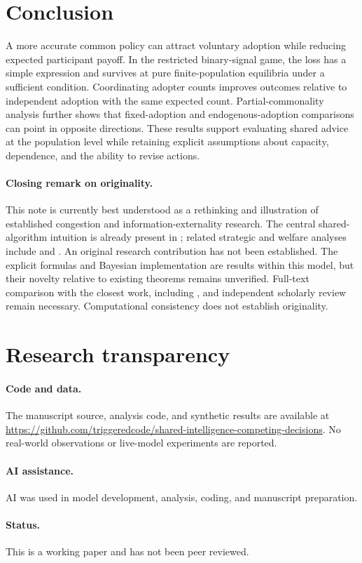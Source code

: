 \documentclass[11pt,a4paper]{article}
\theoremstyle{definition}
\theoremstyle{remark}
\begin{document}
\section{Conclusion}
A more accurate common policy can attract voluntary adoption while reducing expected participant payoff. In the restricted binary-signal game, the loss has a simple expression and survives at pure finite-population equilibria under a sufficient condition. Coordinating adopter counts improves outcomes relative to independent adoption with the same expected count. Partial-commonality analysis further shows that fixed-adoption and endogenous-adoption comparisons can point in opposite directions. These results support evaluating shared advice at the population level while retaining explicit assumptions about capacity, dependence, and the ability to revise actions.

\paragraph{Closing remark on originality.} This note is currently best understood as a rethinking and illustration of established congestion and information-externality research. The central shared-algorithm intuition is already present in \citet{kleinberg2021}; related strategic and welfare analyses include \citet{baek2026} and \citet{kleinberg2026poa}. An original research contribution has not been established. The explicit formulas and Bayesian implementation are results within this model, but their novelty relative to existing theorems remains unverified. Full-text comparison with the closest work, including \citet{chi2026}, and independent scholarly review remain necessary. Computational consistency does not establish originality.

\section*{Research transparency}
\paragraph{Code and data.} The manuscript source, analysis code, and synthetic results are available at \url{https://github.com/triggeredcode/shared-intelligence-competing-decisions}. No real-world observations or live-model experiments are reported.
\paragraph{AI assistance.} AI was used in model development, analysis, coding, and manuscript preparation.
\paragraph{Status.} This is a working paper and has not been peer reviewed.



\end{document}

